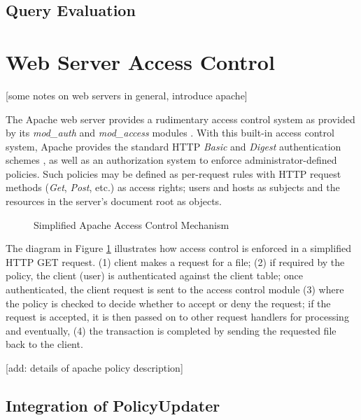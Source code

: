 \documentclass{llncs}
\begin{document}
    \subsection{Query Evaluation}

  \section{Web Server Access Control}

    [some notes on web servers in general, introduce apache]

    The Apache web server provides a rudimentary access control system as
    provided by its {\em mod\_auth} and {\em mod\_access} modules
    \cite{AP,LAU}. With this built-in access control system, Apache provides
    the standard HTTP {\em Basic} and {\em Digest} authentication schemes
    \cite{HTTP2}, as well as an authorization system to enforce
    administrator-defined policies. Such policies may be defined as per-request
    rules with HTTP request methods ({\em Get}, {\em Post}, etc.) \cite{HTTP1}
    as access rights; users and hosts as subjects and the resources in the
    server's document root as objects.

    \begin{figure}[ht]
      \begin{center}
        \caption{Simplified Apache Access Control Mechanism}
        \label{fig-1}
      \end{center}
    \end{figure}

    The diagram in Figure \ref{fig-1} illustrates how access control is
    enforced in a simplified HTTP GET request. (1) client makes a request for a
    file; (2) if required by the policy, the client (user) is authenticated
    against the client table; once authenticated, the client request is sent
    to the access control module (3) where the policy is checked to decide
    whether to accept or deny the request; if the request is accepted, it is
    then passed on to other request handlers for processing and eventually,
    (4) the transaction is completed by sending the requested file back to
    the client.

    [add: details of apache policy description]

    \subsection{Integration of PolicyUpdater}
\end{document}
